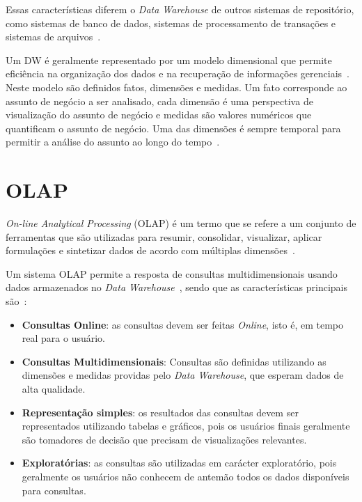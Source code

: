 Essas características diferem o \textit{Data Warehouse} de outros sistemas de repositório, como sistemas de banco de dados, sistemas de processamento de transações e sistemas de arquivos~\cite{silva:2015:abordagensParaCubo,bimonteOpenIssuesBig2016}.

Um DW é geralmente representado por um modelo dimensional que permite eficiência na organização dos dados e na recuperação de informações gerenciais~\cite{kimballDataWarehouseToolkit2013}.
Neste modelo são definidos fatos, dimensões e medidas.
Um fato corresponde ao assunto de negócio a ser analisado, cada dimensão é uma perspectiva de visualização do assunto de negócio e medidas são valores numéricos que quantificam o assunto de negócio.
Uma das dimensões é sempre temporal para permitir a análise do assunto ao longo do tempo~\cite{silva:2015:abordagensParaCubo}.

\section{OLAP}
\label{ch:fun:olap}

\textit{On-line Analytical Processing} (OLAP) é um termo que se refere a um conjunto de ferramentas que são utilizadas para resumir, consolidar, visualizar, aplicar formulações e sintetizar dados de acordo com múltiplas dimensões~\cite{coddProvidingOlapUseranalysts1998}.

Um sistema OLAP permite a resposta de consultas multidimensionais usando dados armazenados no \textit{Data Warehouse}~\cite{kimballDataWarehouseToolkit2013}, sendo que as características principais são~\cite{bimonteOpenIssuesBig2016}:

\begin{itemize}
	\item \textbf{Consultas Online}: as consultas devem ser feitas \textit{Online}, isto é, em tempo real para o usuário.
	\item \textbf{Consultas Multidimensionais}: Consultas são definidas utilizando as dimensões e medidas providas pelo \textit{Data Warehouse}, que esperam dados de alta qualidade.
	\item \textbf{Representação simples}: os resultados das consultas devem ser representados utilizando tabelas e gráficos, pois os usuários finais geralmente são tomadores de decisão que precisam de visualizações relevantes.
	\item \textbf{Exploratórias}: as consultas são utilizadas em carácter exploratório, pois geralmente os usuários não conhecem de antemão todos os dados disponíveis para consultas.
\end{itemize}

